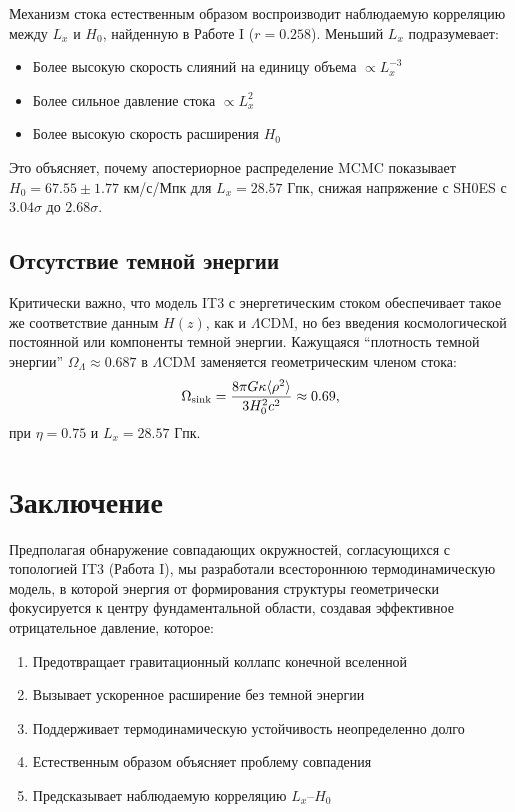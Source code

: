 \documentclass[12pt,a4paper]{article}
\begin{document}
Механизм стока естественным образом воспроизводит наблюдаемую корреляцию между $L_x$ и $H_0$, найденную в Работе I ($r = 0.258$). Меньший $L_x$ подразумевает:
\begin{itemize}
    \item Более высокую скорость слияний на единицу объема $\propto L_x^{-3}$
    \item Более сильное давление стока $\propto L_x^2$
    \item Более высокую скорость расширения $H_0$
\end{itemize}

Это объясняет, почему апостериорное распределение MCMC показывает $H_0 = 67.55 \pm 1.77$ км/с/Мпк для $L_x = 28.57$ Гпк, снижая напряжение с SH0ES с $3.04\sigma$ до $2.68\sigma$.

\subsection{Отсутствие темной энергии}

Критически важно, что модель IT3 с энергетическим стоком обеспечивает такое же соответствие данным $H(z)$, как и $\Lambda$CDM, но без введения космологической постоянной или компоненты темной энергии. Кажущаяся ``плотность темной энергии'' $\Omega_\Lambda \approx 0.687$ в $\Lambda$CDM заменяется геометрическим членом стока:
\begin{equation}
\Omega_{\rm sink} = \frac{8\pi G \kappa \langle \rho^2 \rangle}{3H_0^2 c^2} \approx 0.69,
\end{equation}
при $\eta = 0.75$ и $L_x = 28.57$ Гпк.

\section{Заключение}

Предполагая обнаружение совпадающих окружностей, согласующихся с топологией IT3 (Работа I), мы разработали всестороннюю термодинамическую модель, в которой энергия от формирования структуры геометрически фокусируется к центру фундаментальной области, создавая эффективное отрицательное давление, которое:
\begin{enumerate}
    \item Предотвращает гравитационный коллапс конечной вселенной
    \item Вызывает ускоренное расширение без темной энергии
    \item Поддерживает термодинамическую устойчивость неопределенно долго
    \item Естественным образом объясняет проблему совпадения
    \item Предсказывает наблюдаемую корреляцию $L_x$--$H_0$
\end{enumerate}
\end{document}

